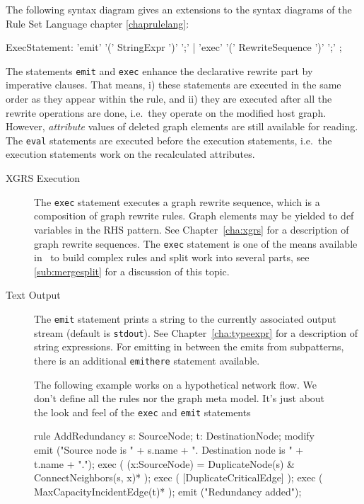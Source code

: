 The following syntax diagram gives an extensions to the syntax diagrams of the Rule Set Language chapter \ref{chaprulelang}:
\begin{rail}
  ExecStatement: 'emit' '(' StringExpr ')' ';' | 'exec' '(' RewriteSequence ')' ';'
	;
\end{rail}
The statements \texttt{emit} and \texttt{exec} enhance the declarative rewrite part by imperative clauses.
That means, i) these statements are executed in the same order as they appear within the rule,
and ii) they are executed after all the rewrite operations are done, i.e.\ they operate on the modified host graph.
However, \emph{attribute} values of deleted graph elements are still available for reading.
The \texttt{eval} statements are executed before the execution statements, i.e.\ the execution statements work on the recalculated attributes.
\begin{description}
  \item[XGRS Execution] The \texttt{exec} statement executes a graph rewrite sequence, which is a composition of graph rewrite rules. Graph elements may be yielded to def variables in the RHS pattern. See Chapter~\ref{cha:xgrs} for a description of graph rewrite sequences. The \texttt{exec} statement is one of the means available in \GrG~to build complex rules and split work into several parts, see \ref{sub:mergesplit} for a discussion of this topic.
  \item[Text Output] The \texttt{emit} statement prints a string to the currently associated output stream (default is \texttt{stdout}). See Chapter~\ref{cha:typeexpr} for a description of string expressions.
  For emitting in between the emits from subpatterns, there is an additional \texttt{emithere} statement available.
\end{description}

\begin{figure}[htbp]
\begin{example}
	The following example works on a hypothetical network flow.
	We don't define all the rules nor the graph meta model.
	It's just about the look and feel of the \texttt{exec} and \texttt{emit} statements
	\begin{grgen}
rule AddRedundancy
{
  s: SourceNode;
  t: DestinationNode;
  modify {
    emit ("Source node is " + s.name + ". Destination node is " + t.name + ".");
    exec ( (x:SourceNode) = DuplicateNode(s) & ConnectNeighbors(s, x)* );
    exec ( [DuplicateCriticalEdge] );
    exec ( MaxCapacityIncidentEdge(t)* );
    emit ("Redundancy added");
  }
}
	\end{grgen}
\end{example}
\end{figure}

